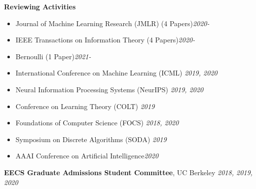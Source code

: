 \documentclass[margin,centered]{res}
\begin{document}
\begin{resume}
\textbf{Reviewing Activities}
\begin{itemize}\itemsep0em
  \item Journal of Machine Learning Research (JMLR) (4 Papers)\hfill{\emph{2020-}}
  \item IEEE Transactions on Information Theory (4 Papers)\hfill{\emph{2020-}}
  \item Bernoulli (1 Paper)\hfill{\emph{2021-}}
  \item International Conference on Machine Learning (ICML) \hfill{\emph{2019,
      2020}}
    \item Neural Information Processing Systems (NeurIPS) \hfill{\emph{2019,
      2020}}
    \item Conference on Learning Theory (COLT) \hfill{\emph{2019}}
    \item Foundations of Computer Science (FOCS) \hfill{
    \emph{2018, 2020}}
    \item Symposium on Discrete Algorithms (SODA) \hfill{
    \emph{2019}}
    \item AAAI Conference on Artificial Intelligence\hfill{\emph{2020}}
\end{itemize}


\textbf{EECS Graduate Admissions Student Committee}, UC Berkeley
\hfill{\emph{2018, 2019, 2020}}





\end{resume}
\end{document}
